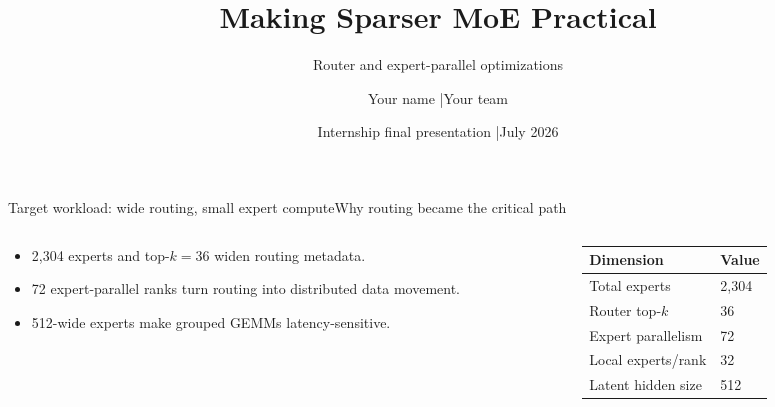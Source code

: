 \documentclass[aspectratio=169,10pt]{beamer}
\title{Making Sparser MoE Practical}
\subtitle{Router and expert-parallel optimizations}
\author{Your name \enspace|\enspace Your team}
\date{Internship final presentation \enspace|\enspace July 2026}
\begin{document}
{\begin{frame}[plain]
  \titlepage
\end{frame}}


\begin{frame}{Target workload: wide routing, small expert compute}{Why routing became the critical path}
  \begin{columns}[T,onlytextwidth]
    \begin{column}{.53\textwidth}
      \begin{itemize}
        \item 2,304 experts and top-$k=36$ widen routing metadata.
        \item 72 expert-parallel ranks turn routing into distributed data movement.
        \item 512-wide experts make grouped GEMMs latency-sensitive.
      \end{itemize}
    \end{column}
    \begin{column}{.42\textwidth}
      \renewcommand{\arraystretch}{1.3}
      \begin{tabularx}{\linewidth}{@{}>{\NvidiaSansMedium}l X@{}}
        \toprule
        Dimension & Value \\
        \midrule
        Total experts & 2,304 \\
        Router top-$k$ & 36 \\
        Expert parallelism & 72 \\
        Local experts/rank & 32 \\
        Latent hidden size & 512 \\
        \bottomrule
      \end{tabularx}
    \end{column}
  \end{columns}
\end{frame}
\end{document}
